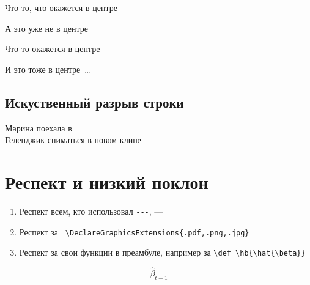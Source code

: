 \documentclass[12pt, a4paper]{article}
\begin{document}
\begin{center}
Что-то, что окажется в центре
\end{center}

А это уже не в центре

 \center Что-то окажется в центре

И это тоже в центре~\ldots 


\subsection{Искуственный разрыв строки} 

 Марина поехала в \\  Геленджик сниматься  в новом клипе 


\section{ Респект и низкий поклон} 

\begin{enumerate}
\item Респект всем, кто использовал \verb|---|, ---
\item Респект за \verb| \DeclareGraphicsExtensions{.pdf,.png,.jpg}| 
\item Респект за свои функции в преамбуле, например за \verb|\def \hb{\hat{\beta}}|
\end{enumerate}

\def \hb{\hat{\beta}}

\[ \hb_{t-1} \]
\end{document}
